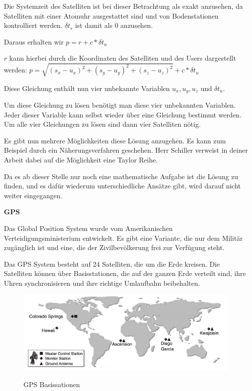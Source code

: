 Die Systemzeit des Satelliten ist bei dieser Betrachtung als exakt anzusehen, da Satelliten mit einer Atomuhr ausgestattet sind und von Bodenstationen kontrolliert werden. $\delta t_{s}$ ist damit als 0 anzusehen.

Daraus erhalten wir $p = r + c * \delta t_{u}$

$r$ kann hierbei durch die Koordinaten des Satelliten und des Users dargestellt werden: $p = \sqrt{(s_{x} - u_{x})^{2} + (s_{y} - u_{y})^{2} + (s_{z}-u_{z})^{2}} + c * \delta t_{u}$

Diese Gleichung enthält nun vier unbekannte Variablen $u_{x}, u_{y}, u_{z}$ und $\delta t_{u}$. 

Um diese Gleichung zu lösen benötigt man diese vier unbekannten Variablen. Jeder dieser Variable kann selbst wieder über eine Gleichung bestimmt werden. Um alle vier Gleichungen zu lösen sind dann vier Satelliten nötig. 

Es gibt nun mehrere Möglichkeiten diese Lösung anzugehen. Es kann zum Beispiel durch ein Näherungsverfahren geschehen. Herr Schiller verweist in deiner Arbeit dabei auf die Möglichkeit eine Taylor Reihe.

Da es ab dieser Stelle nur noch eine mathematische Aufgabe ist die Lösung zu finden, und es dafür wiederum unterschiedliche Ansätze gibt, wird darauf nicht weiter eingegangen.

\cite[S. 190]{Schiller2004}


\textbf{GPS}

Das Global Position System wurde vom Amerikanischen Verteidigungsministerium entwickelt. Es gibt eine Variante, die nur dem Militär zugänglich ist und eine, die der Zivilbevölkerung frei zur Verfügung steht. 

Das GPS System besteht auf 24 Satelliten, die um die Erde kreisen. Die Satelliten können über Basisstationen, die auf der ganzen Erde verteilt sind, ihre Uhren synchronisieren und ihre richtige Umlaufbahn beibehalten. 
\cite[S. 162]{Kuepper2005}


\begin{figure}[h]
\centering
\includegraphics[width=0.99\textwidth]{ref/images/GPS_Basisstation.PNG}
\caption[GPS Basissationen]{GPS Basissationen}
\label{fig:GPS Basissationen}
\cite[S. 163]{Kuepper2005}
\end{figure}


